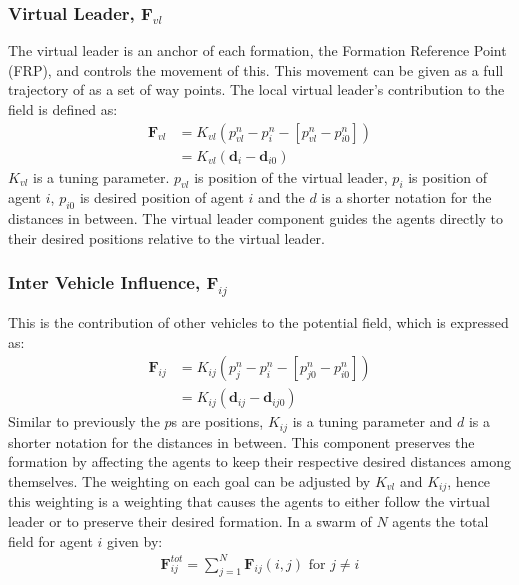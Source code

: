 \documentclass[conference]{IEEEtran}
\begin{document}
\subsubsection{Virtual Leader, $\mathbf{F}_{vl}$}
The virtual leader is an anchor of each formation, the Formation Reference Point (FRP), and
controls the movement of this. This movement can be given as a
full trajectory of as a set of way points. The local virtual leader's
contribution to the field is defined as:
\begin{align}
\mathbf{F}_{vl} &= K_{vl}(p_{vl}^n-p_i^n-[p_{vl}^n-p_{i0}^n])\\
&= K_{vl}(\mathbf{d}_i-\mathbf{d}_{i0})
\end{align}
$K_{vl}$ is a tuning parameter. $p_{vl}$ is position of the virtual
leader, $p_i$ is position of agent $i$, $p_{i0}$ is desired position
of agent $i$ and the $d$ is a shorter notation for the distances in
between. The virtual leader component guides the agents directly to
their desired positions relative to the virtual leader.

\subsubsection{Inter Vehicle Influence, $\mathbf{F}_{ij}$}
This is the contribution of other vehicles to the potential field,
which is expressed as:
\begin{align}
\mathbf{F}_{ij} &= K_{ij}(p_{j}^n-p_i^n-[p_{j0}^n-p_{i0}^n])\\
&= K_{ij}(\mathbf{d}_{ij}-\mathbf{d}_{ij0})
\end{align}
Similar to previously the $p$s are positions, $K_{ij}$ is a tuning
parameter and $d$ is a shorter notation for the distances in between.
This component preserves the formation by affecting the agents to keep
their respective desired distances among themselves. The weighting on
each goal can be adjusted by $K_{vl}$ and $K_{ij}$, hence this
weighting is a weighting that causes the agents to either follow the
virtual leader or to preserve their desired formation.  In a swarm of
$N$ agents the total field for agent $i$ given by:
\begin{align}
\mathbf{F}_{ij}^{tot} = \sum\limits_{j=1}^N\mathbf{F}_{ij}(i,j) \text{ for } j\neq i
\end{align}
\end{document}
